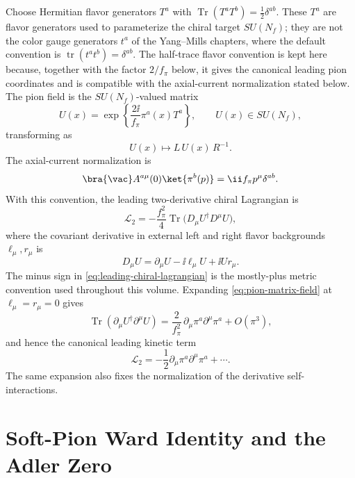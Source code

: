 Choose Hermitian flavor generators \(T^a\) with
\(\operatorname{Tr}(T^aT^b)=\frac12\delta^{ab}\).  These \(T^a\) are flavor
generators used to parameterize the chiral target \(SU(N_f)\); they are not
the color gauge generators \(t^a\) of the Yang--Mills chapters, where the
default convention is \(\operatorname{tr}(t^a t^b)=\delta^{ab}\).  The
half-trace flavor convention is kept here because, together with the factor
\(2/f_\pi\) below, it gives the canonical leading pion coordinates and is
compatible with the axial-current normalization stated below.
The pion field is the
\(SU(N_f)\)-valued matrix
\begin{equation}
  U(x)
  =
  \exp\left\{\frac{2\ii}{f_\pi}\pi^a(x)T^a\right\},
  \qquad
  U(x)\in SU(N_f),
  \label{eq:pion-matrix-field}
\end{equation}
transforming as
\begin{equation}
  U(x)
  \longmapsto
  L\,U(x)\,R^{-1}.
  \label{eq:pion-chiral-transformation}
\end{equation}
The axial-current normalization is
\[
  \bra{\vac}A^{a\mu}(0)\ket{\pi^b(p)}
  =
  \ii f_\pi p^\mu\delta^{ab}.
\]
With this convention, the leading two-derivative chiral Lagrangian is
\begin{equation}
  \mathcal L_2
  =
  -\frac{f_\pi^2}{4}
  \operatorname{Tr}
  \bigl(D_\mu U^\dagger D^\mu U\bigr),
  \label{eq:leading-chiral-lagrangian}
\end{equation}
where the covariant derivative in external left and right flavor backgrounds
\(\ell_\mu,r_\mu\) is
\begin{equation}
  D_\mu U
  =
  \partial_\mu U-\ii\ell_\mu U+\ii U r_\mu .
  \label{eq:pion-external-covariant-derivative}
\end{equation}
The minus sign in \eqref{eq:leading-chiral-lagrangian} is the mostly-plus
metric convention used throughout this volume.  Expanding
\eqref{eq:pion-matrix-field} at \(\ell_\mu=r_\mu=0\) gives
\[
  \operatorname{Tr}(\partial_\mu U^\dagger\partial^\mu U)
  =
  \frac2{f_\pi^2}\,
  \partial_\mu\pi^a\partial^\mu\pi^a
  +O(\pi^3),
\]
and hence the canonical leading kinetic term
\[
  \mathcal L_2
  =
  -\frac12\partial_\mu\pi^a\partial^\mu\pi^a+\cdots .
\]
The same expansion also fixes the normalization of the derivative
self-interactions.

\section{Soft-Pion Ward Identity and the Adler Zero}
\label{sec:soft-pion-adler-zero}

